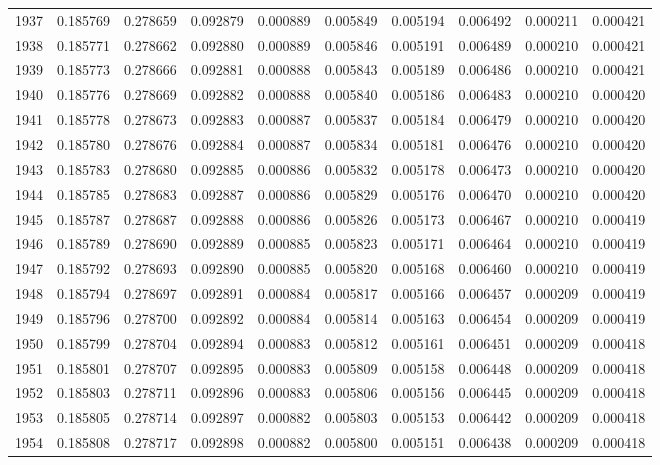 \begin{tabular}{lrrrrrrrrr}
1937 & 0.185769 & 0.278659 & 0.092879 & 0.000889 & 0.005849 & 0.005194 & 0.006492 & 0.000211 & 0.000421 \\
1938 & 0.185771 & 0.278662 & 0.092880 & 0.000889 & 0.005846 & 0.005191 & 0.006489 & 0.000210 & 0.000421 \\
1939 & 0.185773 & 0.278666 & 0.092881 & 0.000888 & 0.005843 & 0.005189 & 0.006486 & 0.000210 & 0.000421 \\
1940 & 0.185776 & 0.278669 & 0.092882 & 0.000888 & 0.005840 & 0.005186 & 0.006483 & 0.000210 & 0.000420 \\
1941 & 0.185778 & 0.278673 & 0.092883 & 0.000887 & 0.005837 & 0.005184 & 0.006479 & 0.000210 & 0.000420 \\
1942 & 0.185780 & 0.278676 & 0.092884 & 0.000887 & 0.005834 & 0.005181 & 0.006476 & 0.000210 & 0.000420 \\
1943 & 0.185783 & 0.278680 & 0.092885 & 0.000886 & 0.005832 & 0.005178 & 0.006473 & 0.000210 & 0.000420 \\
1944 & 0.185785 & 0.278683 & 0.092887 & 0.000886 & 0.005829 & 0.005176 & 0.006470 & 0.000210 & 0.000420 \\
1945 & 0.185787 & 0.278687 & 0.092888 & 0.000886 & 0.005826 & 0.005173 & 0.006467 & 0.000210 & 0.000419 \\
1946 & 0.185789 & 0.278690 & 0.092889 & 0.000885 & 0.005823 & 0.005171 & 0.006464 & 0.000210 & 0.000419 \\
1947 & 0.185792 & 0.278693 & 0.092890 & 0.000885 & 0.005820 & 0.005168 & 0.006460 & 0.000210 & 0.000419 \\
1948 & 0.185794 & 0.278697 & 0.092891 & 0.000884 & 0.005817 & 0.005166 & 0.006457 & 0.000209 & 0.000419 \\
1949 & 0.185796 & 0.278700 & 0.092892 & 0.000884 & 0.005814 & 0.005163 & 0.006454 & 0.000209 & 0.000419 \\
1950 & 0.185799 & 0.278704 & 0.092894 & 0.000883 & 0.005812 & 0.005161 & 0.006451 & 0.000209 & 0.000418 \\
1951 & 0.185801 & 0.278707 & 0.092895 & 0.000883 & 0.005809 & 0.005158 & 0.006448 & 0.000209 & 0.000418 \\
1952 & 0.185803 & 0.278711 & 0.092896 & 0.000883 & 0.005806 & 0.005156 & 0.006445 & 0.000209 & 0.000418 \\
1953 & 0.185805 & 0.278714 & 0.092897 & 0.000882 & 0.005803 & 0.005153 & 0.006442 & 0.000209 & 0.000418 \\
1954 & 0.185808 & 0.278717 & 0.092898 & 0.000882 & 0.005800 & 0.005151 & 0.006438 & 0.000209 & 0.000418 \\

\end{tabular}
